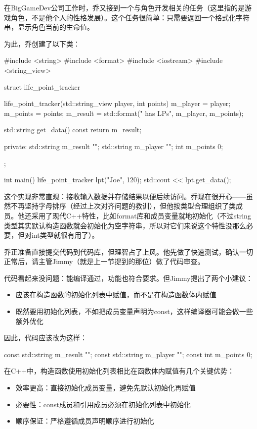 
在BigGameDev公司工作时，乔又接到一个与角色开发相关的任务（这里指的是游戏角色，不是他个人的性格发展）。这个任务很简单：只需要返回一个格式化字符串，显示角色当前的生命值。

为此，乔创建了以下类：

\begin{cpp}
#include <string>
#include <format>
#include <iostream>
#include <string_view>

struct life_point_tracker {
  life_point_tracker(std::string_view player, int points) {
    m_player = player;
    m_points = points;
    m_result = std::format("{} has {} LPs",
    m_player, m_points);
  }

  std::string get_data() const {
    return m_result;
  }

private:
  std::string m_result {""};
  std::string m_player {""};
  int m_points {0};
};

int main() {
  life_point_tracker lpt("Joe", 120);
  std::cout << lpt.get_data();
}
\end{cpp}


这个实现非常直观：接收输入数据并存储结果以便后续访问。乔现在很开心——虽然不再坚持字母排序（经过上次对齐问题的教训），但他按类型合理组织了类成员。他还采用了现代C++特性，比如format库和成员变量就地初始化（不过string类型其实默认构造函数就会初始化为空字符串，所以对它们来说这个特性没那么必要，但对int类型就很有用了）。

乔正准备直接提交代码到代码库，但理智占了上风。他先做了快速测试，确认一切正常后，请主管Jimmy（就是上一节提到的那位）做了代码审查。

代码看起来没问题：能编译通过，功能也符合要求。但Jimmy提出了两个小建议：

\begin{itemize}
\item 
应该在构造函数的初始化列表中赋值，而不是在构造函数体内赋值

\item 
既然要用初始化列表，不如把成员变量声明为const，这样编译器可能会做一些额外优化
\end{itemize}

因此，代码应该改为这样：

\begin{cpp}
const std::string m_result {""};
const std::string m_player {""};
const int m_points {0};
\end{cpp}

在C++中，构造函数使用初始化列表相比在函数体内赋值有几个关键优势：

\begin{itemize}
\item 
效率更高：直接初始化成员变量，避免先默认初始化再赋值

\item 
必要性：const成员和引用成员必须在初始化列表中初始化

\item 
顺序保证：严格遵循成员声明顺序进行初始化
\end{itemize}

